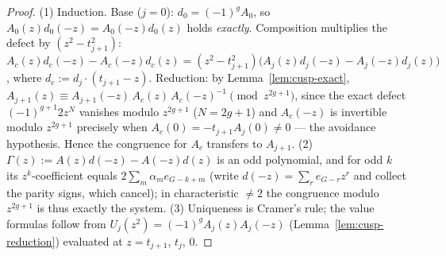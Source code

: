 \begin{proof}
\leanok
(1) Induction. Base ($j = 0$): $d_0 = (-1)^g A_0$, so
$A_0(z)d_0(-z) = A_0(-z)d_0(z)$ holds \emph{exactly}. Composition multiplies the defect
by $(z^2 - t_{j+1}^2)$:
$A_c(z)d_c(-z) - A_c(-z)d_c(z) =
(z^2 - t_{j+1}^2)\bigl(A_j(z)d_j(-z) - A_j(-z)d_j(z)\bigr)$, where
$d_c := d_j \cdot (t_{j+1} - z)$. Reduction: by Lemma~\ref{lem:cusp-exact},
$A_{j+1}(z) \equiv A_{j+1}(-z)\,A_c(z)\,A_c(-z)^{-1} \pmod{z^{2g+1}}$, since the exact
defect $(-1)^{g+1}2z^N$ vanishes modulo $z^{2g+1}$ ($N = 2g+1$) and $A_c(-z)$ is
invertible modulo $z^{2g+1}$ precisely when $A_c(0) = -t_{j+1}A_j(0) \neq 0$ --- the
avoidance hypothesis. Hence the congruence for $A_c$ transfers to $A_{j+1}$.
(2) $\Gamma(z) := A(z)d(-z) - A(-z)d(z)$ is an odd polynomial, and for odd $k$ its
$z^k$-coefficient equals $2\sum_m \alpha_m e_{G-k+m}$ (write $d(-z) = \sum_r e_{G-r} z^r$
and collect the parity signs, which cancel); in characteristic $\neq 2$ the congruence
modulo $z^{2g+1}$ is thus exactly the system.
(3) Uniqueness is Cramer's rule; the value formulas follow from
$U_j(z^2) = (-1)^g A_j(z)A_j(-z)$ (Lemma~\ref{lem:cusp-reduction}) evaluated at
$z = t_{j+1}$, $t_j$, $0$.
\end{proof}

